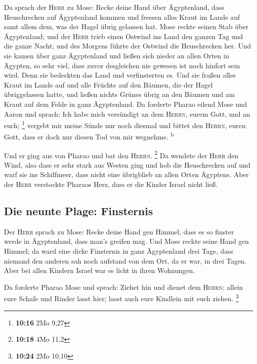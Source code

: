  Da sprach der \textsc{Herr} zu Mose: Recke deine Hand
über Ägyptenland, dass Heuschrecken auf Ägyptenland kommen und fressen
alles Kraut im Lande auf samt allem dem, was der Hagel übrig gelassen
hat.  Mose reckte seinen Stab über Ägyptenland; und der
\textsc{Herr} trieb einen Ostwind ins Land den ganzen Tag und die ganze
Nacht; und des Morgens führte der Ostwind die Heuschrecken her.
 Und sie kamen über ganz Ägyptenland und ließen sich
nieder an allen Orten in Ägypten, so sehr viel, dass zuvor desgleichen
nie gewesen ist noch hinfort sein wird.  Denn sie
bedeckten das Land und verfinsterten es. Und sie fraßen alles Kraut im
Lande auf und alle Früchte auf den Bäumen, die der Hagel übriggelassen
hatte, und ließen nichts Grünes übrig an den Bäumen und am Kraut auf dem
Felde in ganz Ägyptenland.  Da forderte Pharao eilend
Mose und Aaron und sprach: Ich habe mich versündigt an dem
\textsc{Herrn}, eurem Gott, und an euch; \footnote{\textbf{10:16} 2Mo
  9,27}  vergebt mir meine Sünde nur noch diesmal und
bittet den \textsc{Herrn}, euren Gott, dass er doch nur diesen Tod von
mir wegnehme. \textsuperscript{b}

 Und er ging aus von Pharao und bat den \textsc{Herrn}.
\footnote{\textbf{10:18} 4Mo 11,2}  Da wendete der
\textsc{Herr} den Wind, also dass er sehr stark aus Westen ging und hob
die Heuschrecken auf und warf sie ins Schilfmeer, dass nicht eine
übrigblieb an allen Orten Ägyptens.  Aber der
\textsc{Herr} verstockte Pharaos Herz, dass er die Kinder Israel nicht
ließ.

\hypertarget{die-neunte-plage-finsternis}{%
\subsection{Die neunte Plage:
Finsternis}\label{die-neunte-plage-finsternis}}

 Der \textsc{Herr} sprach zu Mose: Recke deine Hand gen
Himmel, dass es so finster werde in Ägyptenland, dass man's greifen mag.
 Und Mose reckte seine Hand gen Himmel; da ward eine
dicke Finsternis in ganz Ägyptenland drei Tage,  dass
niemand den anderen sah noch aufstand von dem Ort, da er war, in drei
Tagen. Aber bei allen Kindern Israel war es licht in ihren Wohnungen.

 Da forderte Pharao Mose und sprach: Ziehet hin und
dienet dem \textsc{Herrn}; allein eure Schafe und Rinder lasst hier;
lasst auch eure Kindlein mit euch ziehen. \footnote{\textbf{10:24} 2Mo
  10,10}

